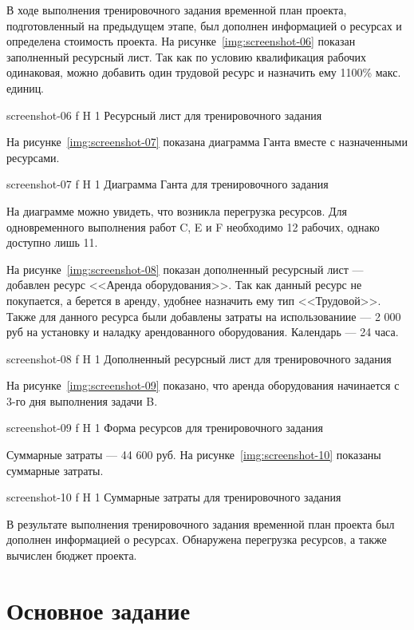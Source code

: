 \documentclass{bmstu}
\begin{document}
В ходе выполнения тренировочного задания временной план проекта, подготовленный на предыдущем этапе, был дополнен информацией о ресурсах и определена стоимость проекта. 
На рисунке~\ref{img:screenshot-06} показан заполненный ресурсный лист. 
Так как по условию квалификация рабочих одинаковая, можно добавить один трудовой ресурс и назначить ему 1100\% макс. единиц.
    
    {screenshot-06}
    {f}
    {H}
    {1\textwidth}
    {Ресурсный лист для тренировочного задания}
    
На рисунке~\ref{img:screenshot-07} показана диаграмма Ганта вместе с назначенными ресурсами.
    
    {screenshot-07}
    {f}
    {H}
    {1\textwidth}
    {Диаграмма Ганта для тренировочного задания}
    
На диаграмме можно увидеть, что возникла перегрузка ресурсов. 
Для одновременного выполнения работ C, E и F необходимо 12 рабочих, однако доступно лишь 11.
    
На рисунке~\ref{img:screenshot-08} показан дополненный ресурсный лист --- добавлен ресурс <<Аренда оборудования>>. 
Так как данный ресурс не покупается, а берется в аренду, удобнее назначить ему тип <<Трудовой>>. 
Также для данного ресурса были добавлены затраты на использованиие --- 2 000 руб на установку и наладку арендованного оборудования. 
Календарь --- 24 часа.
    
    {screenshot-08}
    {f}
    {H}
    {1\textwidth}
    {Дополненный ресурсный лист для тренировочного задания}
    
На рисунке~\ref{img:screenshot-09} показано, что аренда оборудования начинается с 3-го дня выполнения задачи B.
    
    {screenshot-09}
    {f}
    {H}
    {1\textwidth}
    {Форма ресурсов для тренировочного задания}
    
Суммарные затраты --- 44 600 руб. 
На рисунке~\ref{img:screenshot-10} показаны суммарные затраты.
    
    {screenshot-10}
    {f}
    {H}
    {1\textwidth}
    {Суммарные затраты для тренировочного задания}
    
В результате выполнения тренировочного задания временной план проекта был дополнен информацией о ресурсах. 
Обнаружена перегрузка ресурсов, а также вычислен бюджет проекта.
    
\section{Основное задание}
\end{document}

